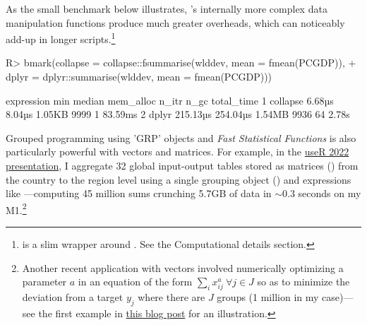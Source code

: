 \documentclass[article]{jss} %
\newcommand{\fct}[1]{\code{#1()}}
\begin{document}
As the small benchmark below illustrates, 's internally more complex data manipulation functions produce much greater overheads, which can noticeably add-up in longer scripts.\footnote{\fct{bmark} is a slim wrapper around \fct{bench::mark}. See the Computational details section.}
%
\begin{Schunk}
\begin{Sinput}
R> bmark(collapse = collapse::fsummarise(wlddev, mean = fmean(PCGDP)),
+        dplyr = dplyr::summarise(wlddev, mean = fmean(PCGDP)))
\end{Sinput}
\begin{Soutput}
  expression      min   median mem_alloc n_itr n_gc total_time
1   collapse   6.68µs   8.04µs    1.05KB  9999    1    83.59ms
2      dplyr 215.13µs 254.04µs    1.54MB  9936   64      2.78s
\end{Soutput}
\end{Schunk}
%
Grouped programming using 'GRP' objects and \emph{Fast Statistical Functions} is also particularly powerful with vectors and matrices. For example, in the \href{https://raw.githubusercontent.com/SebKrantz/collapse/master/misc/useR2022\%20presentation/collapse_useR2022_final.pdf}{useR 2022 presentation}, I aggregate 32 global input-output tables stored as matrices () from the country to the region level using a single grouping object () and expressions like ---computing 45 million sums crunching 5.7GB of data in $\sim$0.3 seconds on my M1.\footnote{Another recent application with vectors involved numerically optimizing a parameter $a$ in an equation of the form $\sum_i x_{ij}^a\ \forall j\in J$ so as to minimize the deviation from a target $y_j$ where there are $J$ groups (1 million in my case)---see the first example in \href{https://sebkrantz.github.io/Rblog/2023/04/12/collapse-and-the-fastverse-reflecting-the-past-present-and-future/}{this blog post} for an illustration.}
%
\newpage
%
\end{document}
